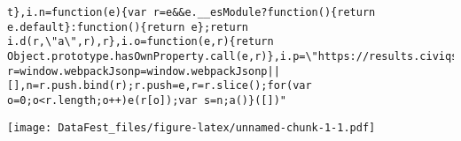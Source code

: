 \documentclass[
]{article}
\newenvironment{Shaded}{\begin{snugshade}}{\end{snugshade}}
\newcommand{\CommentTok}[1]{\textcolor[rgb]{0.56,0.35,0.01}{\textit{#1}}}
\newcommand{\DataTypeTok}[1]{\textcolor[rgb]{0.13,0.29,0.53}{#1}}
\newcommand{\DecValTok}[1]{\textcolor[rgb]{0.00,0.00,0.81}{#1}}
\newcommand{\FloatTok}[1]{\textcolor[rgb]{0.00,0.00,0.81}{#1}}
\newcommand{\KeywordTok}[1]{\textcolor[rgb]{0.13,0.29,0.53}{\textbf{#1}}}
\newcommand{\NormalTok}[1]{#1}
\newcommand{\OperatorTok}[1]{\textcolor[rgb]{0.81,0.36,0.00}{\textbf{#1}}}
\newcommand{\StringTok}[1]{\textcolor[rgb]{0.31,0.60,0.02}{#1}}
\begin{document}
\begin{verbatim}
t},i.n=function(e){var r=e&&e.__esModule?function(){return e.default}:function(){return e};return i.d(r,\"a\",r),r},i.o=function(e,r){return Object.prototype.hasOwnProperty.call(e,r)},i.p=\"https://results.civiqs.com/\";var r=window.webpackJsonp=window.webpackJsonp||[],n=r.push.bind(r);r.push=e,r=r.slice();for(var o=0;o<r.length;o++)e(r[o]);var s=n;a()}([])"
\end{verbatim}

\begin{Shaded}
\end{Shaded}

\texttt{[image: DataFest\_files/figure-latex/unnamed-chunk-1-1.pdf]}
\end{document}
